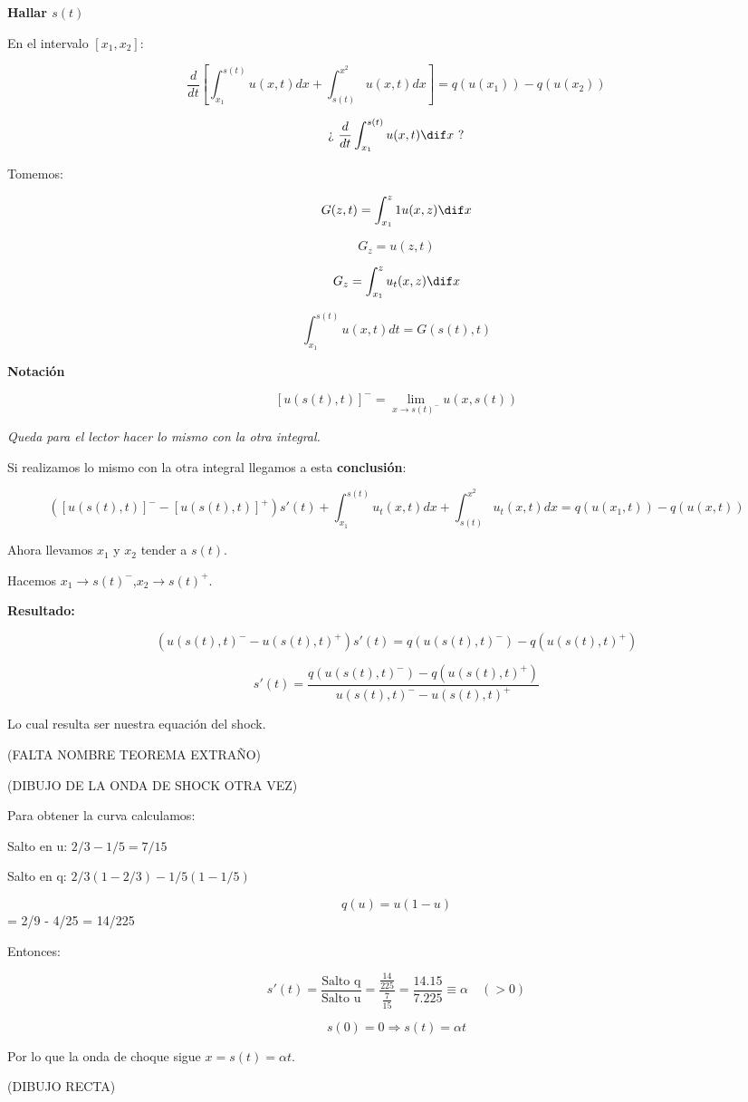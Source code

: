 		\textbf{Hallar $s(t)$}

		\begin{figure}[hbtp]
			\centering
			\caption{}
			\label{fig:discontinuidadAtasco}
		\end{figure}



		En el intervalo $[x_1,x_2]$:

		$$\frac{d}{dt} \left[ \int^{s(t)}_{x_1} u(x,t) dx + \int^{x^2}_{s(t)} u(x,t) dx \right] = q(u(x_1)) - q(u(x_2))$$


		$$ \text{¿ } \frac{d}{dt} \int^{s(t)}_{x_1} u(x,t) \dif x \text{ ?} $$

		Tomemos:

		$$G(z,t) = \int^z_{x_1}1 u(x,z) \dif x $$

		$$G_z = u(z,t) $$

		$$G_z = \int^{z}_{x_1} u_t(x,z) \dif x $$

		$$\int^{s(t)}_{x_1} u(x,t) dt = G(s(t),t)$$


		\textbf{Notación}

		$$[u(s(t),t)]^{-} = \lim_{x \to s(t)^{-}} u(x, s(t)) $$

		\textit{Queda para el lector hacer lo mismo con la otra integral.}

		Si realizamos lo mismo con la otra integral llegamos a esta \textbf{conclusión}:

		$$([u(s(t),t)]^{-} - [u(s(t),t)]^{+}) s'(t) +  \int^{s(t)}_{x_1} u_t(x,t) dx + \int^{x^2}_{s(t)} u_t(x,t) dx = q(u(x_1,t)) - q(u(x,t)) $$

		Ahora llevamos $x_1$ y $x_2$ tender a $s(t)$.

		Hacemos $x_1 \rightarrow s(t)^{-}$,$x_2 \rightarrow s(t)^{+}$.


		\textbf{Resultado:}

		$$(u(s(t),t)^{-} - u(s(t),t)^{+}) s'(t) = q(u(s(t),t)^{-}) - q(u(s(t),t)^{+})$$

		$$s'(t) = \frac{q(u(s(t),t)^{-}) - q(u(s(t),t)^{+})}{u(s(t),t)^{-} - u(s(t),t)^{+}} $$

		Lo cual resulta ser nuestra equación del shock.

		(FALTA NOMBRE TEOREMA EXTRAÑO)

		(DIBUJO DE LA ONDA DE SHOCK OTRA VEZ)

		Para obtener la curva calculamos:

		Salto en u: $2/3 - 1/5 = 7/15$

		Salto en q: $2/3(1-2/3) - 1/5(1-1/5)$

		$$q(u) = u (1-u)$$ = 2/9 - 4/25 = 14/225


		Entonces:

		$$s'(t) = \frac{\text{Salto q}}{\text{Salto u}} = \frac{\frac{14}{225}}{\frac{7}{15}} = \frac{14.15}{7.225} \equiv \alpha \quad(>0)$$

		$$s(0) = 0 \Rightarrow s(t) = \alpha t $$

		Por lo que la onda de choque sigue $x = s(t) = \alpha t$.

		(DIBUJO RECTA)








